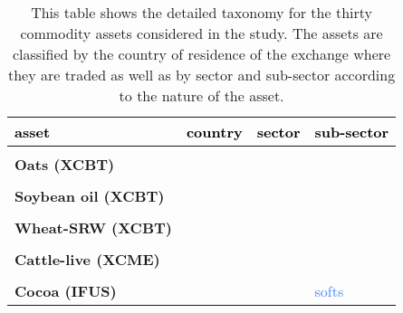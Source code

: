 \documentclass[
  authoryear,
  preprint,
  3p]{elsarticle}
\begin{document}
\begin{longtable}[t]{>{}l>{}l>{}l>{}l}

\caption{\label{tbl-assets-taxonomy}This table shows the detailed
taxonomy for the thirty commodity assets considered in the study. The
assets are classified by the country of residence of the exchange where
they are traded as well as by sector and sub-sector according to the
nature of the asset.}

\tabularnewline

\toprule
\textcolor{black}{\textbf{asset}} & \textcolor{black}{\textbf{country}} & \textcolor{black}{\textbf{sector}} & \textcolor{black}{\textbf{sub-sector}}\\
\midrule
\textbf{\cellcolor{gray!10}{Corn-\#2 yellow (XCBT)}} & \textcolor[HTML]{4285f4}{\cellcolor{gray!10}{US}} & \textcolor[HTML]{4285f4}{\cellcolor{gray!10}{agriculturals}} & \textcolor[HTML]{4285f4}{\cellcolor{gray!10}{grains}}\\
\textbf{Oats (XCBT)} & \textcolor[HTML]{4285f4}{} & \textcolor[HTML]{4285f4}{} & \textcolor[HTML]{4285f4}{}\\
\textbf{\cellcolor{gray!10}{Soybean meal (XCBT)}} & \textcolor[HTML]{4285f4}{\cellcolor{gray!10}{}} & \textcolor[HTML]{4285f4}{\cellcolor{gray!10}{}} & \textcolor[HTML]{4285f4}{\cellcolor{gray!10}{}}\\
\textbf{Soybean oil (XCBT)} & \textcolor[HTML]{4285f4}{} & \textcolor[HTML]{4285f4}{} & \textcolor[HTML]{4285f4}{}\\
\textbf{\cellcolor{gray!10}{Soybeans (XCBT)}} & \textcolor[HTML]{4285f4}{\cellcolor{gray!10}{}} & \textcolor[HTML]{4285f4}{\cellcolor{gray!10}{}} & \textcolor[HTML]{4285f4}{\cellcolor{gray!10}{}}\\
\addlinespace
\textbf{Wheat-SRW (XCBT)} & \textcolor[HTML]{4285f4}{} & \textcolor[HTML]{4285f4}{} & \textcolor[HTML]{4285f4}{}\\
\textbf{\cellcolor{gray!10}{Cattle-feeder (XCME)}} & \textcolor[HTML]{4285f4}{\cellcolor{gray!10}{}} & \textcolor[HTML]{4285f4}{\cellcolor{gray!10}{}} & \textcolor[HTML]{4285f4}{\cellcolor{gray!10}{livestock}}\\
\textbf{Cattle-live (XCME)} & \textcolor[HTML]{4285f4}{} & \textcolor[HTML]{4285f4}{} & \textcolor[HTML]{4285f4}{}\\
\textbf{\cellcolor{gray!10}{Lean hogs (XCME)}} & \textcolor[HTML]{4285f4}{\cellcolor{gray!10}{}} & \textcolor[HTML]{4285f4}{\cellcolor{gray!10}{}} & \textcolor[HTML]{4285f4}{\cellcolor{gray!10}{}}\\
\textbf{Cocoa (IFUS)} & \textcolor[HTML]{4285f4}{} & \textcolor[HTML]{4285f4}{} & \textcolor[HTML]{4285f4}{softs}\\

\end{longtable}
\end{document}
